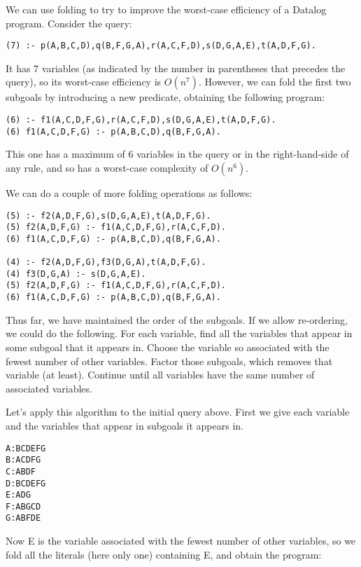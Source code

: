 We can use folding to try to improve the worst-case efficiency of a
Datalog program.  Consider the query:

\begin{verbatim}
(7) :- p(A,B,C,D),q(B,F,G,A),r(A,C,F,D),s(D,G,A,E),t(A,D,F,G).
\end{verbatim}

It has 7 variables (as indicated by the number in parentheses that
precedes the query), so its worst-case efficiency is $O(n^7)$.
However, we can fold the first two subgoals by introducing a new
predicate, obtaining the following program:

\begin{verbatim}
(6) :- f1(A,C,D,F,G),r(A,C,F,D),s(D,G,A,E),t(A,D,F,G).
(6) f1(A,C,D,F,G) :- p(A,B,C,D),q(B,F,G,A).
\end{verbatim}

This one has a maximum of 6 variables in the query or in the
right-hand-side of any rule, and so has a worst-case complexity of
$O(n^6)$.

We can do a couple of more folding operations as follows:

\begin{verbatim}
(5) :- f2(A,D,F,G),s(D,G,A,E),t(A,D,F,G).
(5) f2(A,D,F,G) :- f1(A,C,D,F,G),r(A,C,F,D).
(6) f1(A,C,D,F,G) :- p(A,B,C,D),q(B,F,G,A).

(4) :- f2(A,D,F,G),f3(D,G,A),t(A,D,F,G).
(4) f3(D,G,A) :- s(D,G,A,E).
(5) f2(A,D,F,G) :- f1(A,C,D,F,G),r(A,C,F,D).
(6) f1(A,C,D,F,G) :- p(A,B,C,D),q(B,F,G,A).
\end{verbatim}

Thus far, we have maintained the order of the subgoals.  If we allow
re-ordering, we could do the following.  For each variable, find all
the variables that appear in some subgoal that it appears in.  Choose
the variable so associated with the fewest number of other variables.
Factor those subgoals, which removes that variable (at least).
Continue until all variables have the same number of associated
variables.

Let's apply this algorithm to the initial query above.  First we give
each variable and the variables that appear in subgoals it appears in.

\begin{verbatim}
A:BCDEFG
B:ACDFG
C:ABDF
D:BCDEFG
E:ADG
F:ABGCD
G:ABFDE
\end{verbatim}

Now E is the variable associated with the fewest number of other
variables, so we fold all the literals (here only one) containing E,
and obtain the program:

